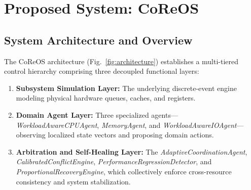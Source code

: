 \documentclass[conference]{IEEEtran}
\begin{document}
\section{Proposed System: CoReOS}
\label{sec:proposed_system}

\subsection{System Architecture and Overview}
The CoReOS architecture (Fig.~\ref{fig:architecture}) establishes a multi-tiered control hierarchy comprising three decoupled functional layers:
\begin{enumerate}
    \item \textbf{Subsystem Simulation Layer:} The underlying discrete-event engine modeling physical hardware queues, caches, and registers.
    \item \textbf{Domain Agent Layer:} Three specialized agents—\textit{WorkloadAwareCPUAgent}, \textit{MemoryAgent}, and \textit{WorkloadAwareIOAgent}—observing localized state vectors and proposing domain actions.
    \item \textbf{Arbitration and Self-Healing Layer:} The \textit{AdaptiveCoordinationAgent}, \textit{CalibratedConflictEngine}, \textit{PerformanceRegressionDetector}, and \textit{ProportionalRecoveryEngine}, which collectively enforce cross-resource consistency and system stabilization.
\end{enumerate}
\end{document}
